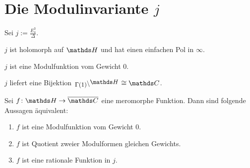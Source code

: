 \section[Die Modulinvariante \texorpdfstring{$j$}{j}]{Die Modulinvariante {\boldmath $j$}}

\begin{defi}
Sei $j := \frac{E_4^3}{\Delta}$.
\end{defi}

\begin{satz-list}
\item $j$ ist holomorph auf $\HH$ und hat einen einfachen Pol in $\infty$.
\item $j$ ist eine Modulfunktion vom Gewicht $0$.
\item $j$ liefert eine Bijektion $\linksmodulo{\Gamma(1)}{\HH} \cong \CC$.
\end{satz-list}

\begin{satz}
Sei $f\colon \HH \to \closure{\CC}$ eine meromorphe Funktion. Dann sind folgende Aussagen äquivalent:
\begin{enumerate}
\item $f$ ist eine Modulfunktion vom Gewicht 0.
\item $f$ ist Quotient zweier Modulformen gleichen Gewichts.
\item $f$ ist eine rationale Funktion in $j$.
\end{enumerate}
\end{satz}